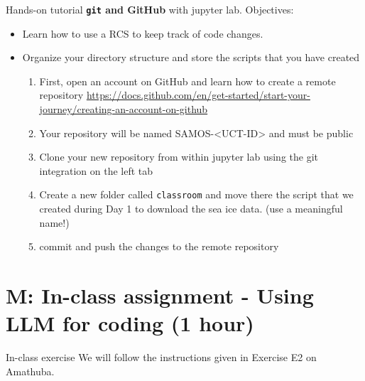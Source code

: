 \documentclass[english,aspectratio=169]{beamer}
\begin{document}
\begin{frame}{Hands-on tutorial}
\textbf{\texttt{git} and GitHub} with jupyter lab. Objectives:
    \begin{itemize}
    \item  Learn how to use a RCS to keep track of code changes.
    \item Organize your directory structure and store the scripts that you have created
    \begin{enumerate}
        \item First, open an account on GitHub and learn how to create a remote repository \href{https://docs.github.com/en/get-started/start-your-journey/creating-an-account-on-github}{https://docs.github.com/en/get-started/start-your-journey/creating-an-account-on-github}
        \item  Your repository will be named SAMOS-<UCT-ID> and must be public
        \item Clone your new repository from within jupyter lab using the git integration on the left tab
        \item Create a new folder called \texttt{classroom} and move there the script that we created during Day 1 to download the sea ice data. (use a meaningful name!)
        \item commit and push the changes to the remote repository
    \end{enumerate}
    \end{itemize}
     
\end{frame}

\section{M: In-class assignment - Using LLM for coding (1 hour)}
%
\begin{frame}{In-class exercise}
    We will follow the instructions given in Exercise E2 on Amathuba.
\end{frame}
\end{document}
